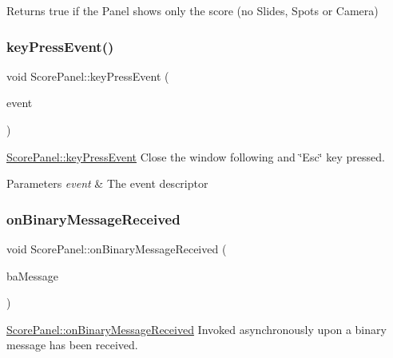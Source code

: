 \begin{DoxyReturn}{Returns}
true if the Panel shows only the score (no Slides, Spots or Camera) 
\end{DoxyReturn}
\mbox{\label{classScorePanel_a21276568d4ca7a413087b59d7b5a39cc}} 
\subsubsection{\texorpdfstring{key\+Press\+Event()}{keyPressEvent()}}
{\footnotesize\ttfamily void Score\+Panel\+::key\+Press\+Event (\begin{DoxyParamCaption}\item[{Q\+Key\+Event $\ast$}]{event }\end{DoxyParamCaption})}



\mbox{\hyperlink{classScorePanel_a21276568d4ca7a413087b59d7b5a39cc}{Score\+Panel\+::key\+Press\+Event}} Close the window following and \char`\"{}\+Esc\char`\"{} key pressed. 


\begin{DoxyParams}{Parameters}
{\em event} & The event descriptor \\
\hline
\end{DoxyParams}
\mbox{\label{classScorePanel_a2588d1e54b9c669ea352bab4215bef42}} 
\subsubsection{\texorpdfstring{on\+Binary\+Message\+Received}{onBinaryMessageReceived}}
{\footnotesize\ttfamily void Score\+Panel\+::on\+Binary\+Message\+Received (\begin{DoxyParamCaption}\item[{Q\+Byte\+Array}]{ba\+Message }\end{DoxyParamCaption})\hspace{0.3cm}{\ttfamily [slot]}}



\mbox{\hyperlink{classScorePanel_a2588d1e54b9c669ea352bab4215bef42}{Score\+Panel\+::on\+Binary\+Message\+Received}} Invoked asynchronously upon a binary message has been received. 


